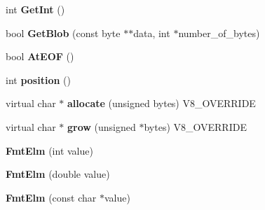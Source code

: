 \begin{DoxyCompactItemize}
\item 
\hypertarget{classv8_1_1internal_1_1_v8___f_i_n_a_l_a25ebdf2cc9d10b58fe7757ecb08e79f1}{}int {\bfseries Get\+Int} ()\label{classv8_1_1internal_1_1_v8___f_i_n_a_l_a25ebdf2cc9d10b58fe7757ecb08e79f1}

\item 
\hypertarget{classv8_1_1internal_1_1_v8___f_i_n_a_l_aaf6a9fb55a3d6a06b9af1ed93ea5a5e4}{}bool {\bfseries Get\+Blob} (const byte $\ast$$\ast$data, int $\ast$number\+\_\+of\+\_\+bytes)\label{classv8_1_1internal_1_1_v8___f_i_n_a_l_aaf6a9fb55a3d6a06b9af1ed93ea5a5e4}

\item 
\hypertarget{classv8_1_1internal_1_1_v8___f_i_n_a_l_ad82e51458c8ccc7499410e8bc1accfa4}{}bool {\bfseries At\+E\+O\+F} ()\label{classv8_1_1internal_1_1_v8___f_i_n_a_l_ad82e51458c8ccc7499410e8bc1accfa4}

\item 
\hypertarget{classv8_1_1internal_1_1_v8___f_i_n_a_l_a669f29b78031ddbd40b3222990bdde82}{}int {\bfseries position} ()\label{classv8_1_1internal_1_1_v8___f_i_n_a_l_a669f29b78031ddbd40b3222990bdde82}

\item 
\hypertarget{classv8_1_1internal_1_1_v8___f_i_n_a_l_abc5384e32d083a272d8a4180fb0c6de9}{}virtual char $\ast$ {\bfseries allocate} (unsigned bytes) V8\+\_\+\+O\+V\+E\+R\+R\+I\+D\+E\label{classv8_1_1internal_1_1_v8___f_i_n_a_l_abc5384e32d083a272d8a4180fb0c6de9}

\item 
\hypertarget{classv8_1_1internal_1_1_v8___f_i_n_a_l_ac1c98fc1027db6285d44613663684e87}{}virtual char $\ast$ {\bfseries grow} (unsigned $\ast$bytes) V8\+\_\+\+O\+V\+E\+R\+R\+I\+D\+E\label{classv8_1_1internal_1_1_v8___f_i_n_a_l_ac1c98fc1027db6285d44613663684e87}

\item 
\hypertarget{classv8_1_1internal_1_1_v8___f_i_n_a_l_a40e81c9df88c9c8d7d794819872ac6f8}{}{\bfseries Fmt\+Elm} (int value)\label{classv8_1_1internal_1_1_v8___f_i_n_a_l_a40e81c9df88c9c8d7d794819872ac6f8}

\item 
\hypertarget{classv8_1_1internal_1_1_v8___f_i_n_a_l_a31f3a7109bd86acb3849d45d06d5d672}{}{\bfseries Fmt\+Elm} (double value)\label{classv8_1_1internal_1_1_v8___f_i_n_a_l_a31f3a7109bd86acb3849d45d06d5d672}

\item 
\hypertarget{classv8_1_1internal_1_1_v8___f_i_n_a_l_a74319546822386b894d246d70edac315}{}{\bfseries Fmt\+Elm} (const char $\ast$value)\label{classv8_1_1internal_1_1_v8___f_i_n_a_l_a74319546822386b894d246d70edac315}


\end{DoxyCompactItemize}
